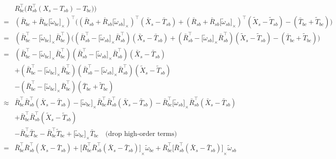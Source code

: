 \documentclass[letter,10pt]{article}
\newcommand{\asym}[1]{{\lbrack #1\rbrack}_\times{}}
\begin{document}
\begin{equation}
\begin{aligned}
 & R_{bc}^\top\big(R_{sb}^\top(X_s-T_{sb})-T_{bc})\big) \\
 = & (\bar R_{bc} + \bar R_{bc}\asym{\tilde\omega_{bc}})^\top
 \big( (\bar R_{sb} + \bar R_{sb}\asym{\tilde\omega_{sb}})^\top (\bar X_s - \bar T_{sb}) + (\bar R_{sb} + \bar R_{sb}\asym{\tilde\omega_{sb}})^\top (\tilde X_s - \tilde T_{sb}) - (\bar T_{bc} + \tilde T_{bc}) \big) \\
 = & (\bar R_{bc}^\top - \asym{\tilde\omega_{bc}} \bar R_{bc}^\top)
 \big( (\bar R_{sb}^\top - \asym{\tilde\omega_{sb}} \bar R_{sb}^\top) (\bar X_s - \bar T_{sb}) + (\bar R_{sb}^\top - \asym{\tilde\omega_{sb}} \bar R_{sb}^\top) (\tilde X_s - \tilde T_{sb}) - (\bar T_{bc} + \tilde T_{bc}) \big) \\
= & (\bar R_{bc}^\top - \asym{\tilde\omega_{bc}} \bar R_{bc}^\top)
 (\bar R_{sb}^\top - \asym{\tilde\omega_{sb}} \bar R_{sb}^\top) (\bar X_s - \bar T_{sb}) \\
 &+ (\bar R_{bc}^\top - \asym{\tilde\omega_{bc}} \bar R_{bc}^
 \top)(\bar R_{sb}^\top - \asym{\tilde\omega_{sb}} \bar R_{sb}^\top) (\tilde X_s - \tilde T_{sb}) \\
 &- (\bar R_{bc}^\top - \asym{\tilde\omega_{bc}} \bar R_{bc}^\top)(\bar T_{bc} + \tilde T_{bc}) \\
 \approx & \bar R_{bc}^\top \bar R_{sb}^\top (\bar X_s - \bar T_{sb}) - \asym{\tilde \omega_{bc}}\bar R_{bc}^\top \bar R_{sb}^\top (\bar X_s - \bar T_{sb}) - \bar R_{bc}^\top \asym{\tilde \omega_{sb}} \bar R_{sb}^\top (\bar X_s - \bar T_{sb}) \\
 &+ \bar R_{bc}^\top\bar R_{sb}^\top (\tilde X_s - \tilde T_{sb}) \\
 &- \bar R_{bc}^\top \bar T_{bc} - \bar R_{bc}^\top \tilde T_{bc} + \asym{\tilde \omega_{bc}} \bar T_{bc} \quad\text{(drop high-order terms)}\\
 = & \bar R_{bc}^\top \bar R_{sb}^\top (\bar X_s - \bar T_{sb}) 
 + \asym{\bar R_{bc}^\top \bar R_{sb}^\top (\bar X_s - \bar T_{sb})}\tilde \omega_{bc} 
 + \bar R_{bc}^\top \asym{\bar R_{sb}^\top (\bar X_s - \bar T_{sb})} \tilde \omega_{sb} \\

\end{aligned}
\end{equation}
\end{document}
